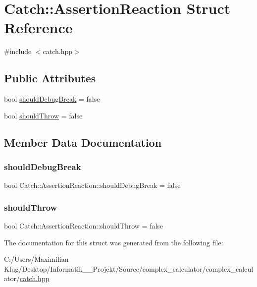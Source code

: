\hypertarget{struct_catch_1_1_assertion_reaction}{}\section{Catch\+:\+:Assertion\+Reaction Struct Reference}
\label{struct_catch_1_1_assertion_reaction}


{\ttfamily \#include $<$catch.\+hpp$>$}

\subsection*{Public Attributes}
\begin{DoxyCompactItemize}
\item 
bool \mbox{\hyperlink{struct_catch_1_1_assertion_reaction_adcf30fb90ff20d9789df78d424652497}{should\+Debug\+Break}} = false
\item 
bool \mbox{\hyperlink{struct_catch_1_1_assertion_reaction_a82c8d95a2c1b6a331bde66982a8e090f}{should\+Throw}} = false
\end{DoxyCompactItemize}


\subsection{Member Data Documentation}
\mbox{\label{struct_catch_1_1_assertion_reaction_adcf30fb90ff20d9789df78d424652497}} 
\subsubsection{\texorpdfstring{should\+Debug\+Break}{shouldDebugBreak}}
{\footnotesize\ttfamily bool Catch\+::\+Assertion\+Reaction\+::should\+Debug\+Break = false}

\mbox{\label{struct_catch_1_1_assertion_reaction_a82c8d95a2c1b6a331bde66982a8e090f}} 
\subsubsection{\texorpdfstring{should\+Throw}{shouldThrow}}
{\footnotesize\ttfamily bool Catch\+::\+Assertion\+Reaction\+::should\+Throw = false}



The documentation for this struct was generated from the following file\+:\begin{DoxyCompactItemize}
\item 
C\+:/\+Users/\+Maximilian Klug/\+Desktop/\+Informatik\+\_\+\_\+\+Projekt/\+Source/complex\+\_\+calculator/complex\+\_\+calculator/\mbox{\hyperlink{catch_8hpp}{catch.\+hpp}}\end{DoxyCompactItemize}
